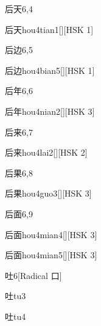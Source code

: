 \begin{entry}{后天}{6,4}
  \begin{phonetics}{后天}{hou4tian1}[][HSK 1]
  \end{phonetics}
\end{entry}

\begin{entry}{后边}{6,5}
  \begin{phonetics}{后边}{hou4bian5}[][HSK 1]
  \end{phonetics}
\end{entry}

\begin{entry}{后年}{6,6}
  \begin{phonetics}{后年}{hou4nian2}[][HSK 3]
  \end{phonetics}
\end{entry}

\begin{entry}{后来}{6,7}
  \begin{phonetics}{后来}{hou4lai2}[][HSK 2]
  \end{phonetics}
\end{entry}

\begin{entry}{后果}{6,8}
  \begin{phonetics}{后果}{hou4guo3}[][HSK 3]
  \end{phonetics}
\end{entry}

\begin{entry}{后面}{6,9}
  \begin{phonetics}{后面}{hou4mian4}[][HSK 3]
  \end{phonetics}
  \begin{phonetics}{后面}{hou4mian5}[][HSK 3]
  \end{phonetics}
\end{entry}

\begin{entry}{吐}{6}[Radical 口]
  \begin{phonetics}{吐}{tu3}
  \end{phonetics}
  \begin{phonetics}{吐}{tu4}
  \end{phonetics}
\end{entry}

